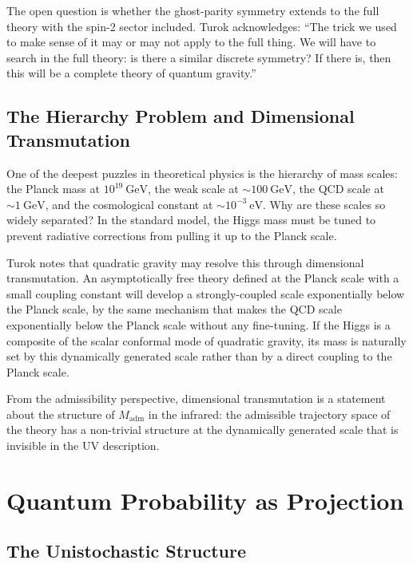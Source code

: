 \documentclass[12pt,a4paper]{article}
\theoremstyle{remark}
\begin{document}
The open question is whether the ghost-parity symmetry extends to the full
theory with the spin-2 sector included. Turok acknowledges: ``The trick we
used to make sense of it may or may not apply to the full thing. We will
have to search in the full theory: is there a similar discrete symmetry?
If there is, then this will be a complete theory of quantum gravity.''

\subsection{The Hierarchy Problem and Dimensional Transmutation}

One of the deepest puzzles in theoretical physics is the hierarchy of mass
scales: the Planck mass at $10^{19}\ \mathrm{GeV}$, the weak scale at
$\sim 100\ \mathrm{GeV}$, the QCD scale at $\sim 1\ \mathrm{GeV}$, and
the cosmological constant at $\sim 10^{-3}\ \mathrm{eV}$. Why are these
scales so widely separated? In the standard model, the Higgs mass must be
tuned to prevent radiative corrections from pulling it up to the Planck
scale.

Turok notes that quadratic gravity may resolve this through dimensional
transmutation. An asymptotically free theory defined at the Planck scale
with a small coupling constant will develop a strongly-coupled scale
exponentially below the Planck scale, by the same mechanism that makes
the QCD scale exponentially below the Planck scale without any fine-tuning.
If the Higgs is a composite of the scalar conformal mode of quadratic
gravity, its mass is naturally set by this dynamically generated scale
rather than by a direct coupling to the Planck scale.

From the admissibility perspective, dimensional transmutation is a statement
about the structure of $M_{\mathrm{adm}}$ in the infrared: the admissible
trajectory space of the theory has a non-trivial structure at the dynamically
generated scale that is invisible in the UV description.


\section{Quantum Probability as Projection}

\subsection{The Unistochastic Structure}
\end{document}
